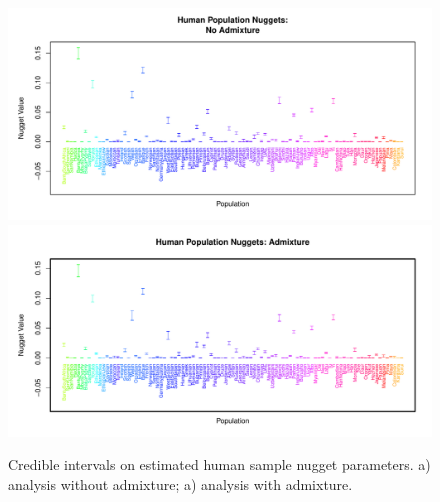 \documentclass[10pt,letterpaper]{article}
\begin{document}
\clearpage

\begin{figure}
\centering
	\subcaptionbox{\label{globe_noad_nugg}}
		{\includegraphics[width=\textwidth]{../figs/globetrotter/globe_NoAd_nugget.pdf}}
	\subcaptionbox{\label{globe_ad_nugg}}
		{\includegraphics[width=\textwidth]{../figs/globetrotter/globe_Ad_nugget.pdf}}
	\caption{Credible intervals on estimated human sample nugget parameters. a) analysis without admixture; a) analysis with admixture.}
	\label{sfig:globe_nuggs}
\end{figure}

\clearpage
\end{document}
